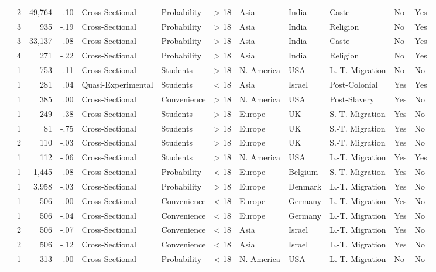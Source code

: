 \documentclass[10pt, letterpaper]{article}
\begin{document}
\begin{landscape}
\begin{xltabular}{650pt}{Xrrrllrlllll}
 & 2 & 49,764 & -.10 & Cross-Sectional & Probability & > 18 & Asia & India & Caste & No & Yes\\
 & 3 & 935 & -.19 & Cross-Sectional & Probability & > 18 & Asia & India & Religion & No & Yes\\
 & 3 & 33,137 & -.08 & Cross-Sectional & Probability & > 18 & Asia & India & Caste & No & Yes\\
 & 4 & 271 & -.22 & Cross-Sectional & Probability & > 18 & Asia & India & Religion & No & Yes\\
\cite{1891} & 1 & 753 & -.11 & Cross-Sectional & Students & > 18 & N. America & USA & L.-T. Migration & No & No\\
\cite{789} & 1 & 281 & .04 & Quasi-Experimental & Students & < 18 & Asia & Israel & Post-Colonial & Yes & Yes\\
\cite{3060} & 1 & 385 & .00 & Cross-Sectional & Convenience & > 18 & N. America & USA & Post-Slavery & Yes & No\\
\cite{733} & 1 & 249 & -.38 & Cross-Sectional & Students & > 18 & Europe & UK & S.-T. Migration & Yes & No\\
\cite{1020} & 1 & 81 & -.75 & Cross-Sectional & Students & > 18 & Europe & UK & S.-T. Migration & Yes & No\\
 & 2 & 110 & -.03 & Cross-Sectional & Students & > 18 & Europe & UK & S.-T. Migration & Yes & No\\
\cite{2375} & 1 & 112 & -.06 & Cross-Sectional & Students & > 18 & N. America & USA & L.-T. Migration & Yes & Yes\\
\cite{46} & 1 & 1,445 & -.08 & Cross-Sectional & Probability & < 18 & Europe & Belgium & S.-T. Migration & Yes & No\\
\cite{1412} & 1 & 3,958 & -.03 & Cross-Sectional & Probability & > 18 & Europe & Denmark & L.-T. Migration & Yes & No\\
\cite{1966} & 1 & 506 & .00 & Cross-Sectional & Convenience & < 18 & Europe & Germany & L.-T. Migration & Yes & No\\
 & 1 & 506 & -.04 & Cross-Sectional & Convenience & < 18 & Europe & Germany & L.-T. Migration & Yes & No\\
 & 2 & 506 & -.07 & Cross-Sectional & Convenience & < 18 & Asia & Israel & L.-T. Migration & Yes & No\\
 & 2 & 506 & -.12 & Cross-Sectional & Convenience & < 18 & Asia & Israel & L.-T. Migration & Yes & No\\
\cite{1221} & 1 & 313 & -.00 & Cross-Sectional & Probability & < 18 & N. America & USA & L.-T. Migration & No & No\\

\end{xltabular}
\end{landscape}
\end{document}
